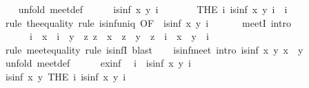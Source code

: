 \begin{isabellebody}
\ \ \isamarkupfalse%
\ {\isacharparenleft}unfold\ meet{\isacharunderscore}def{\isacharparenright}\isanewline
\ \ \ \ \isamarkupfalse%
\ {\isachardoublequoteopen}is{\isacharunderscore}inf\ x\ y\ i{\isachardoublequoteclose}\isanewline
\ \ \ \ \isamarkupfalse%
\ \isamarkupfalse%
\ {\isachardoublequoteopen}{\isacharparenleft}THE\ i{\isachardot}\ is{\isacharunderscore}inf\ x\ y\ i{\isacharparenright}\ {\isacharequal}\ i{\isachardoublequoteclose}\isanewline
\ \ \ \ \ \ \isamarkupfalse%
\ {\isacharparenleft}rule\ the{\isacharunderscore}equality{\isacharparenright}\ {\isacharparenleft}rule\ is{\isacharunderscore}inf{\isacharunderscore}uniq\ {\isacharbrackleft}OF\ {\isacharunderscore}\ {\isacharbackquoteopen}is{\isacharunderscore}inf\ x\ y\ i{\isacharbackquoteclose}{\isacharbrackright}{\isacharparenright}\isanewline
\ \ \isamarkupfalse%
\isanewline
\isanewline
\ \ \isamarkupfalse%
\ meetI\ {\isacharbrackleft}intro{\isacharquery}{\isacharbrackright}{\isacharcolon}\isanewline
\ \ \ \ \ \ {\isachardoublequoteopen}i\ {\isasymsqsubseteq}\ x\ {\isasymLongrightarrow}\ i\ {\isasymsqsubseteq}\ y\ {\isasymLongrightarrow}\ {\isacharparenleft}{\isasymAnd}z{\isachardot}\ z\ {\isasymsqsubseteq}\ x\ {\isasymLongrightarrow}\ z\ {\isasymsqsubseteq}\ y\ {\isasymLongrightarrow}\ z\ {\isasymsqsubseteq}\ i{\isacharparenright}\ {\isasymLongrightarrow}\ x\ {\isasymsqinter}\ y\ {\isacharequal}\ i{\isachardoublequoteclose}\isanewline
\ \ \ \ \isamarkupfalse%
\ {\isacharparenleft}rule\ meet{\isacharunderscore}equality{\isacharcomma}\ rule\ is{\isacharunderscore}infI{\isacharparenright}\ blast{\isacharplus}\isanewline
\isanewline
\ \ \isamarkupfalse%
\ is{\isacharunderscore}inf{\isacharunderscore}meet\ {\isacharbrackleft}intro{\isacharquery}{\isacharbrackright}{\isacharcolon}\ {\isachardoublequoteopen}is{\isacharunderscore}inf\ x\ y\ {\isacharparenleft}x\ {\isasymsqinter}\ y{\isacharparenright}{\isachardoublequoteclose}\isanewline
\ \ \isamarkupfalse%
\ {\isacharparenleft}unfold\ meet{\isacharunderscore}def{\isacharparenright}\isanewline
\ \ \ \ \isamarkupfalse%
\ ex{\isacharunderscore}inf\ \isamarkupfalse%
\ i\ \ {\isachardoublequoteopen}is{\isacharunderscore}inf\ x\ y\ i{\isachardoublequoteclose}\ \isacommand{{\isachardot}{\isachardot}}\isamarkupfalse%
\isanewline
\ \ \ \ \isamarkupfalse%
\ \isamarkupfalse%
\ {\isachardoublequoteopen}is{\isacharunderscore}inf\ x\ y\ {\isacharparenleft}THE\ i{\isachardot}\ is{\isacharunderscore}inf\ x\ y\ i{\isacharparenright}{\isachardoublequoteclose}\isanewline

\end{isabellebody}
